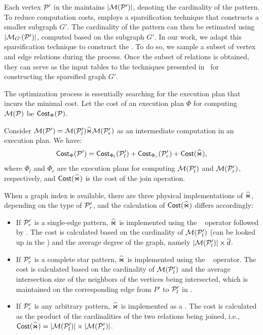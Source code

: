  Each vertex $\mathcal{P}'$ in the \glogue maintains $|\mathcal{M}(\mathcal{P}')|$, denoting the cardinality of the pattern. To reduce computation costs, \glogs employs a sparsification technique that constructs a smaller subgraph $G'$. The cardinality of the pattern can then be estimated using $|\mathcal{M}_{G'}(\mathcal{P}')|$, computed based on the subgraph $G'$. In our work, we adapt this sparsification technique to construct the \glogue. To do so, we sample a subset of vertex and edge relations during the \rgmapping process. Once the subset of relations is obtained, they can serve as the input tables to the techniques presented in~\cite{gart} for constructing the sparsified graph $G'$.

 The optimization process is essentially searching for the execution plan that incurs the minimal cost. Let the cost of an execution plan $\Phi$ for computing $\mathcal{M}(\mathcal{P})$ be ${\mathsf{Cost}}_\Phi(\mathcal{P})$. %

Consider $\mathcal{M}(\mathcal{P}') = \mathcal{M}(\mathcal{P}'_l) \widehat{\Join} \mathcal{M}(\mathcal{P}'_r)$ as an intermediate computation in an execution plan. We have:
\[
{\mathsf{Cost}}_{\Phi}(\mathcal{P}') = {\mathsf{Cost}}_{\Phi_l}(\mathcal{P}'_l) + {\mathsf{Cost}}_{\Phi_r}(\mathcal{P}'_r) + {\mathsf{Cost}}(\widehat{\Join}),
\]
where $\Phi_l$ and $\Phi_r$ are the execution plans for computing $\mathcal{M}(\mathcal{P}'_l)$ and $\mathcal{M}(\mathcal{P}'_r)$, respectively, and ${\mathsf{Cost}}(\widehat{\Join})$ is the cost of the join operation.

When a graph index is available, there are three physical implementations of $\widehat{\Join}$, depending on the type of $\mathcal{P}'_r$, and the calculation of ${\mathsf{Cost}}(\widehat{\Join})$ differs accordingly:
\begin{itemize}
\item If $\mathcal{P}'_r$ is a single-edge pattern, $\widehat{\Join}$ is implemented using the \expandedge~ operator followed by \getvertex. The cost is calculated based on the cardinality of $\mathcal{M}(\mathcal{P}'_l)$ (can be looked up in the \glogue) and the average degree of the graph, namely $|\mathcal{M}(\mathcal{P}'_l)| \times \overline{d}$.
\item If $\mathcal{P}'_r$ is a complete star pattern, $\widehat{\Join}$ is implemented using the \expandintersect~ operator. The cost is calculated based on the cardinality of $\mathcal{M}(\mathcal{P}'_l)$ and the average intersection size of the neighbors of the vertices being intersected, which is maintained on the corresponding edge from $P'$ to $\mathcal{P}'_l$ in \glogue.
\item  If $\mathcal{P}'_r$ is any arbitrary pattern, $\widehat{\Join}$ is implemented as a \hashjoin. The cost is calculated as the product of the cardinalities of the two relations being joined, i.e., ${\mathsf{Cost}}(\widehat{\Join}) = |\mathcal{M}(\mathcal{P}'_l)| \times |\mathcal{M}(\mathcal{P}'_r)|$.
\end{itemize}

